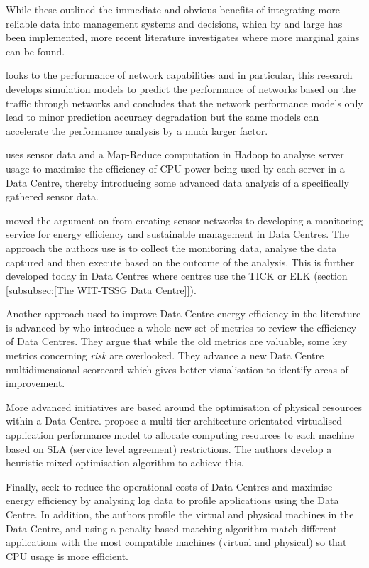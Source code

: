 \documentclass[12pt]{scrartcl}
\begin{document}
While these outlined the immediate and obvious benefits of integrating more reliable data into management systems and decisions, which by and large has been implemented, more recent literature investigates where more marginal gains can be found.  

\citet{edsdoj.47fdd5c4e23a43e3aa37ddd2fb75d82b20160101} looks to the performance of network capabilities and in particular, this research develops simulation models to predict the performance of networks based on the traffic through networks and concludes that the network performance models only lead to minor prediction accuracy degradation but the same models can accelerate the performance analysis by a much larger factor.  

\citet{edsarx.1402.080420140101} uses sensor data and a Map-Reduce computation in Hadoop to analyse server usage to maximise the efficiency of CPU power being used by each server in a Data Centre, thereby introducing some advanced data analysis of a specifically gathered sensor data. 

\citet{edsbas.DFD37F4F20160101} moved the argument on from creating sensor networks to developing a monitoring service for energy efficiency and sustainable management in Data Centres. The approach the authors use is to collect the monitoring data, analyse the data captured and then execute based on the outcome of the analysis. This is further developed today in Data Centres where centres use the TICK or ELK (section \ref{subsubsec:[The WIT-TSSG Data Centre]}).  

Another approach used to improve Data Centre energy efficiency in the literature is advanced by \citet{edsdoj.99f37e7899fb4fcaabdaa81e395626c420180101} who introduce a whole new set of metrics to review the efficiency of Data Centres. They argue that while the old metrics are valuable, some key metrics concerning \emph{risk} are overlooked. They advance a new Data Centre multidimensional scorecard which gives better visualisation to identify areas of improvement. 

More advanced initiatives are based around the optimisation of physical resources within a Data Centre. \citet{10234066620151001} propose a multi-tier architecture-orientated virtualised application performance model to allocate computing resources to each machine based on SLA (service level agreement) restrictions. The authors develop a heuristic mixed optimisation algorithm to achieve this.

Finally, \citet{VASUDEVAN201794} seek to reduce the operational costs of Data Centres and maximise energy efficiency by analysing log data to profile applications using the Data Centre. In addition, the authors profile the virtual and physical machines in the Data Centre, and using a penalty-based matching algorithm match different applications with the most compatible machines (virtual and physical) so that CPU usage is more efficient. 
\end{document}
